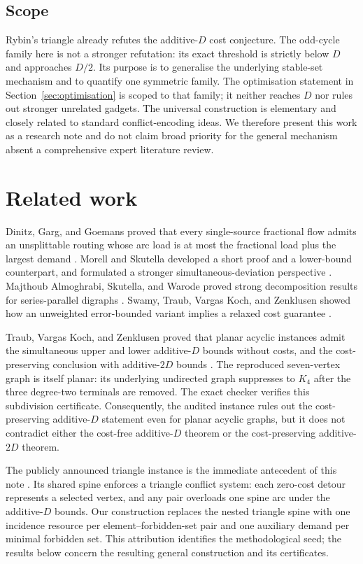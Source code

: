\documentclass[11pt]{article}
\theoremstyle{definition}
\begin{document}
\subsection{Scope}

Rybin's triangle already refutes the additive-\(D\) cost conjecture. The odd-cycle family here is not a stronger refutation: its exact threshold is strictly below \(D\) and approaches \(D/2\). Its purpose is to generalise the underlying stable-set mechanism and to quantify one symmetric family. The optimisation statement in Section~\ref{sec:optimisation} is scoped to that family; it neither reaches \(D\) nor rules out stronger unrelated gadgets. The universal construction is elementary and closely related to standard conflict-encoding ideas. We therefore present this work as a research note and do not claim broad priority for the general mechanism absent a comprehensive expert literature review.

\section{Related work}

Dinitz, Garg, and Goemans proved that every single-source fractional flow admits an unsplittable routing whose arc load is at most the fractional load plus the largest demand \cite{dgg1999}. Morell and Skutella developed a short proof and a lower-bound counterpart, and formulated a stronger simultaneous-deviation perspective \cite{morell2022}. Majthoub Almoghrabi, Skutella, and Warode proved strong decomposition results for series-parallel digraphs \cite{almoghrabi2025}. Swamy, Traub, Vargas Koch, and Zenklusen showed how an unweighted error-bounded variant implies a relaxed cost guarantee \cite{swamy2026}.

Traub, Vargas Koch, and Zenklusen proved that planar acyclic instances admit the simultaneous upper and lower additive-\(D\) bounds without costs, and the cost-preserving conclusion with additive-\(2D\) bounds \cite{traub2026}. The reproduced seven-vertex graph is itself planar: its underlying undirected graph suppresses to \(K_4\) after the three degree-two terminals are removed. The exact checker verifies this subdivision certificate. Consequently, the audited instance rules out the cost-preserving additive-\(D\) statement even for planar acyclic graphs, but it does not contradict either the cost-free additive-\(D\) theorem or the cost-preserving additive-\(2D\) theorem.

The publicly announced triangle instance is the immediate antecedent of this note \cite{rybin2026,rybintranscript2026}. Its shared spine enforces a triangle conflict system: each zero-cost detour represents a selected vertex, and any pair overloads one spine arc under the additive-\(D\) bounds. Our construction replaces the nested triangle spine with one incidence resource per element--forbidden-set pair and one auxiliary demand per minimal forbidden set. This attribution identifies the methodological seed; the results below concern the resulting general construction and its certificates.
\end{document}
